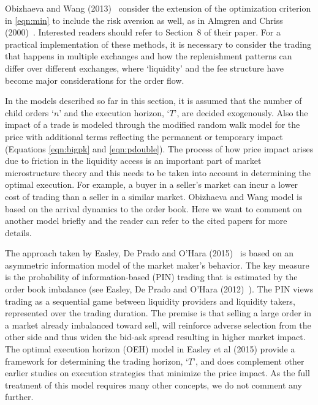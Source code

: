 Obizhaeva and Wang (2013)~\cite{obizhaeva} consider the extension of the optimization criterion in \eqref{eqn:min} to include the risk aversion as well, as in Almgren and Chriss (2000)~\cite{alm2000}. Interested readers should refer to Section~8 of their paper. For a practical implementation of these methods, it is necessary to consider the trading that happens in multiple exchanges and how the replenishment patterns can differ over different exchanges, where `liquidity' and the fee structure have become major considerations for the order flow. 


In the models described so far in this section, it is assumed that the number of child orders `$n$' and the execution horizon, `$T$', are decided exogenously. Also the impact of a trade is modeled through the modified random walk model for the price with additional terms reflecting the permanent or temporary impact (Equations \ref{eqn:bigpk} and \ref{eqn:pdouble}). The process of how price impact arises due to friction in the liquidity access is an important part of market microstructure theory and this needs to be taken into account in determining the optimal execution. For example, a buyer in a seller's market can incur a lower cost of trading than a seller in a similar market. Obizhaeva and Wang model is based on the arrival dynamics to the order book. Here we want to comment on another model briefly and the reader can refer to the cited papers for more details.


The approach taken by Easley, De Prado and O'Hara (2015)~\cite{prado2} is based on an asymmetric information model of the market maker's behavior. The key measure is the probability of information-based (PIN) trading that is estimated by the order book imbalance (see Easley, De Prado and O'Hara (2012)~\cite{prado3}). The PIN views trading as a sequential game between liquidity providers and liquidity takers, represented over the trading duration. The premise is that selling a large order in a market already imbalanced toward sell, will reinforce adverse selection from the other side and thus widen the bid-ask spread resulting in higher market impact. The optimal execution horizon (OEH) model in Easley et al (2015) provide a framework for determining the trading horizon, `$T$', and does complement other earlier studies on execution strategies that minimize the price impact. As the full treatment of this model requires many other concepts, we do not comment any further. 


